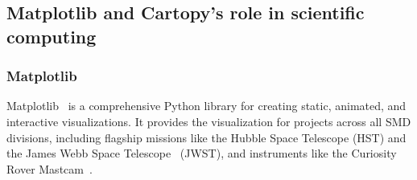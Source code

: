 \documentclass[12pt]{article}
\numberwithin{page}{section}
\begin{document}
\subsection{Matplotlib and Cartopy's role in scientific computing}


\subsubsection{Matplotlib}



Matplotlib~\cite{Hunter:2007} is a comprehensive Python library for creating
static, animated, and interactive visualizations.  It provides the
visualization for projects across all SMD divisions, including flagship
missions like the Hubble Space Telescope (HST) and the James Webb Space
Telescope~\cite{jwst_pipeline} (JWST), and instruments like the Curiosity Rover
Mastcam~\cite{https://doi.org/10.1002/2016EA000219}.
\end{document}

